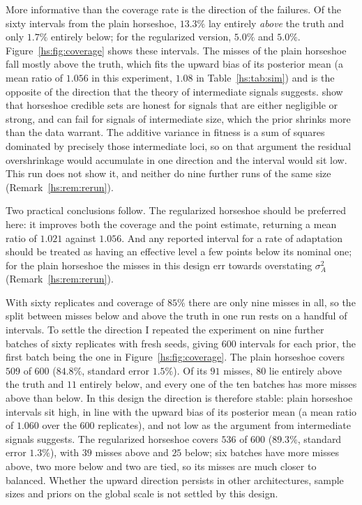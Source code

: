More informative than the coverage rate is the direction of the failures. Of the sixty intervals from the plain horseshoe, $13.3\%$ lay entirely \emph{above} the truth and only $1.7\%$ entirely below; for the regularized version, $5.0\%$ and $5.0\%$. Figure~\ref{hs:fig:coverage} shows these intervals. The misses of the plain horseshoe fall mostly above the truth, which fits the upward bias of its posterior mean (a mean ratio of $1.056$ in this experiment, $1.08$ in Table~\ref{hs:tab:sim}) and is the opposite of the direction that the theory of intermediate signals suggests. \citet{hs:vanderpas2017uncertainty} show that horseshoe credible sets are honest for signals that are either negligible or strong, and can fail for signals of intermediate size, which the prior shrinks more than the data warrant. The additive variance in fitness is a sum of squares dominated by precisely those intermediate loci, so on that argument the residual overshrinkage would accumulate in one direction and the interval would sit low. This run does not show it, and neither do nine further runs of the same size (Remark~\ref{hs:rem:rerun}).

Two practical conclusions follow. The regularized horseshoe should be preferred here: it improves both the coverage and the point estimate, returning a mean ratio of $1.021$ against $1.056$. And any reported interval for a rate of adaptation should be treated as having an effective level a few points below its nominal one; for the plain horseshoe the misses in this design err towards overstating $\sigma^2_A$ (Remark~\ref{hs:rem:rerun}).

\begin{remark}
\label{hs:rem:rerun}
With sixty replicates and coverage of $85\%$ there are only nine misses in all, so the split between misses below and above the truth in one run rests on a handful of intervals. To settle the direction I repeated the experiment on nine further batches of sixty replicates with fresh seeds, giving $600$ intervals for each prior, the first batch being the one in Figure~\ref{hs:fig:coverage}. The plain horseshoe covers $509$ of $600$ ($84.8\%$, standard error $1.5\%$). Of its $91$ misses, $80$ lie entirely above the truth and $11$ entirely below, and every one of the ten batches has more misses above than below. In this design the direction is therefore stable: plain horseshoe intervals sit high, in line with the upward bias of its posterior mean (a mean ratio of $1.060$ over the $600$ replicates), and not low as the argument from intermediate signals suggests. The regularized horseshoe covers $536$ of $600$ ($89.3\%$, standard error $1.3\%$), with $39$ misses above and $25$ below; six batches have more misses above, two more below and two are tied, so its misses are much closer to balanced. Whether the upward direction persists in other architectures, sample sizes and priors on the global scale is not settled by this design.
\end{remark}

